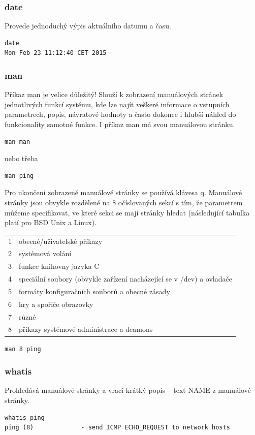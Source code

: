 \documentclass{article}
\begin{document}
\subsubsection{date}
Provede jednoduchý výpis aktuálního datumu a času.
\begin{verbatim}
date
Mon Feb 23 11:12:40 CET 2015
\end{verbatim}

\subsubsection{man}
Příkaz man je velice důležitý! Slouží k zobrazení manuálových stránek jednotlivých funkcí systému, kde lze najít veškeré informace o vstupních parametrech, popis, návratové hodnoty a často dokonce i hlubší náhled do funkcionality samotné funkce. I příkaz man má svou manuálovou stránku.
\begin{verbatim}
man man
\end{verbatim}
nebo třeba
\begin{verbatim}
man ping
\end{verbatim}
Pro ukončení zobrazené manuálové stránky se používá klávesa q. Manuálové stránky jsou obvykle rozdělené na 8 očíslovaných sekcí s tím, že parametrem můžeme specifikovat, ve které sekci se mají stránky hledat (následující tabulka platí pro BSD Unix a Linux).

\begin{tabular}{l p{12cm}}
1 & obecné/uživatelské příkazy\\
2 & systémová volání\\
3 & funkce knihovny jazyka C\\
4 & speciální soubory (obvykle zařízení nacházející se v /dev) a ovladače\\
5 & formáty konfiguračních souborů a obecné zásady\\
6 & hry a spořiče obrazovky\\
7 & různé\\
8 & příkazy systémové administrace a deamons\\
\end{tabular}

\begin{verbatim}
man 8 ping
\end{verbatim}

\subsubsection{whatis}
Prohledává manuálové stránky a vrací krátký popis -- text NAME z manuálové stránky.
\begin{verbatim}
whatis ping
ping (8)             - send ICMP ECHO_REQUEST to network hosts
\end{verbatim} 
\end{document}
